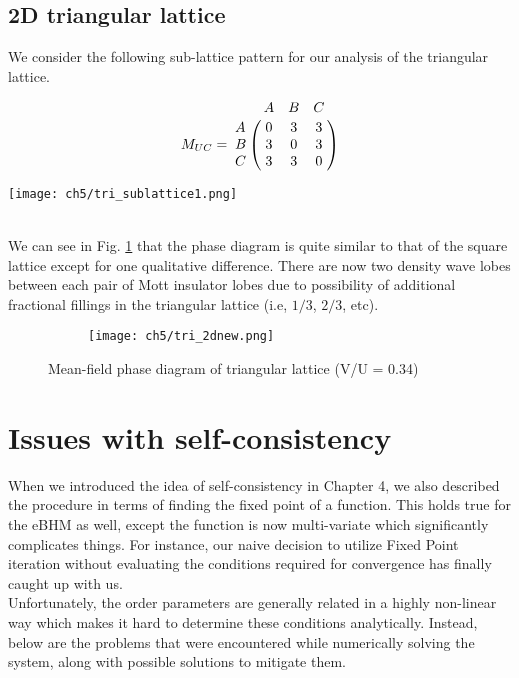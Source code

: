 \subsection{2D triangular lattice}
We consider the following sub-lattice pattern for our analysis of the triangular lattice.

\begin{minipage}{0.4\linewidth}
    \begin{equation*}
        M_{UC} =  \bordermatrix{ & A & B & C \cr
        A & 0 & 3 & 3 \cr
        B & 3 & 0 & 3 \cr
        C & 3 & 3 & 0 }
    \end{equation*}
\end{minipage}%
\hfill
\begin{minipage}{0.5\linewidth}
\centering
\vspace{0.2cm}
\texttt{[image: ch5/tri\_sublattice1.png]}
\end{minipage}
\vspace{0.5cm}\\

We can see in Fig. \ref{fig:ebhm_tri} that the phase diagram is quite similar to that of the square lattice except for one qualitative difference. There are now two density wave lobes between each pair of Mott insulator lobes due to possibility of additional fractional fillings in the triangular lattice (i.e, $1/3$, $2/3$, etc). 

\begin{figure}[!htb]
    \centering
    \begin{subfigure}[b]{0.81\textwidth}  %
        \centering
        \texttt{[image: ch5/tri\_2dnew.png]}
    \end{subfigure}
    \caption{Mean-field phase diagram of triangular lattice (V/U = 0.34)}
    \label{fig:ebhm_tri}
\end{figure}
\FloatBarrier \!\!\!\!\!\!\!\!\!\!\!

\section{Issues with self-consistency}\label{sec:caveats}
When we introduced the idea of self-consistency in Chapter 4, we also described the procedure in terms of finding the fixed point of a function. This holds true for the eBHM as well, except the function is now multi-variate which significantly complicates things. For instance, our naive decision to utilize Fixed Point iteration without evaluating the conditions required for convergence has finally caught up with us. 
\vspace{0.5cm}\\
Unfortunately, the order parameters are generally related in a highly non-linear way which makes it hard to determine these conditions analytically. Instead, below are the problems that were encountered while numerically solving the system, along with possible solutions to mitigate them.

